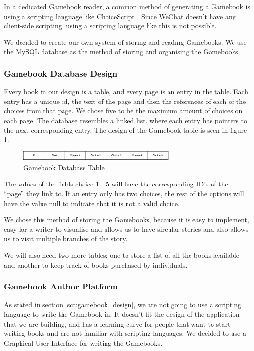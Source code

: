 In a dedicated Gamebook reader, a common method of generating a Gamebook is using a scripting language like ChoiceScript \cite{LLC}. Since WeChat doesn't have any client-side scripting, using a scripting language like this is not possible. 

We decided to create our own system of storing and reading Gamebooks. We use the MySQL database as the method of storing and organising the Gamebooks.

\subsubsection{Gamebook Database Design}

Every book in our design is a table, and every page is an entry in the table. Each entry has a unique id, the text of the page and then the references of each of the choices from that page. We chose five to be the maximum amount of choices on each page. The database resembles a linked list, where each entry has pointers to the next corresponding entry. The design of the Gamebook table is seen in figure \ref{fig:gamebook_database}.

\begin{figure}
  \centering
    \includegraphics[width=0.7\textwidth]{figs/Gamebook_Database.pdf}
   \caption{Gamebook Database Table} 
   \label{fig:gamebook_database}
\end{figure}

The values of the fields choice 1 - 5 will have the corresponding ID's of the ``page'' they link to. If an entry only has two choices, the rest of the options will have the value null to indicate that it is not a valid choice.

We chose this method of storing the Gamebooks, because it is easy to implement, easy for a writer to visualise and allows us to have sircular stories and also allows us to visit multiple branches of the story. 

We will also need two more tables: one to store a list of all the books available and another to keep track of books purchased by individuals. 

\subsubsection{Gamebook Author Platform}

As stated in section \ref{sct:gamebook_design}, we are not going to use a scripting language to write the Gamebook in. It doesn't fit the design of the application that we are building, and has a learning curve for people that want to start writing books and are not familiar with scripting languages. We decided to use a Graphical User Interface for writing the Gamebooks.

